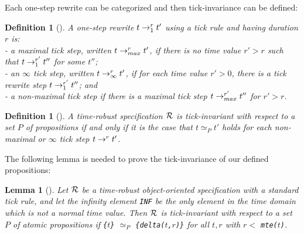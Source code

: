 \documentclass[10pt,journal]{IEEEtran}
\newtheorem{lemma}[theorem]{Lemma}
\newtheorem{definition}[theorem]{Definition}
\begin{document}
{Each one-step rewrite can be categorized and then tick-invariance can
be defined:
\begin{definition}[\cite{DBLP:journals/entcs/OlveczkyM07a}]
A one-step rewrite $t\rightarrow^{r}_{1}t'$ using a tick rule and having
duration $r$ is:\\
- a \emph{maximal tick step}, written $t\rightarrow^{r}_{max}t'$, if there is
no time value $r'>r$ such that $t\rightarrow^{r'}_{1}t''$ for some $t''$; \\
- an \emph{$\infty$ tick step}, written $t\rightarrow^{r}_{\infty}t'$, if
for each time value $r'>0$, there is a tick rewrite step
$t\rightarrow^{r'}_{1}t''$; and \\
- a \emph{non-maximal tick step} if there is a maximal tick step
$t\rightarrow^{r'}_{max}t''$ for $r'>r$.
\end{definition}
\begin{definition}[\cite{DBLP:journals/entcs/OlveczkyM07a}]
  A time-robust specification $\cal R$ is \emph{tick-invariant} with
  respect to a set $P$ of propositions if and only if it is the case
  that $t\simeq_P t'$ holds for each non-maximal or $\infty$ tick step
  $t\rightarrow^{r}_{}t'$.
\end{definition}

The following lemma is needed to prove the tick-invariance of our
defined propositions:
\begin{lemma}[\cite{DBLP:journals/entcs/OlveczkyM07a}]
\label{l:tickinv}
Let $\cal R$ be a time-robust object-oriented specification with a
standard tick rule, and let the infinity element \verb|INF| be the
only element in the time domain which is not a normal time value.
Then $\cal R$ is tick-invariant with respect to a set $P$ of atomic
propositions if \verb|{|$t$\verb|}| $\simeq_P$
\verb|{delta(|$t$\verb|,|$r$\verb|)}| for all $t,r$ with $r<$
\verb|mte(|$t$\verb|)|.
\end{lemma}

\newcommand{\mteTask}[2]{\texttt{mteTask(}#1\texttt{,}#2\texttt{)}}
\newcommand{\deltaTask}[3]{\texttt{deltaTask(}#1\texttt{,}#2\texttt{,}#3\texttt{)}}
\newcommand{\mteIS}[1]{\texttt{mteIS(}#1\texttt{)}}
\newcommand{\deltaIS}[2]{\texttt{deltaIS(}#1\texttt{,}#2\texttt{)}}
\newcommand{\IntSrc}[3]{\texttt{<}#1\texttt{:IntSrc|val:}#2\texttt{,cycle:}#3\texttt{>}}
\newcommand{\mteIr}[1]{\texttt{mteIr(}#1\texttt{)}}
\newcommand{\mteS}[1]{\texttt{mte(}#1\texttt{)}}
\newcommand{\deltaS}[2]{\texttt{delta(}#1\texttt{,}#2\texttt{)}}
 
}
\end{document}
